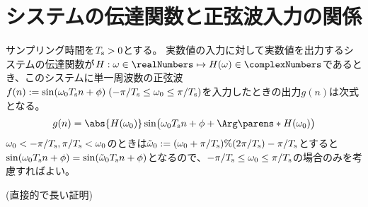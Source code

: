     \section{システムの伝達関数と正弦波入力の関係}
        \begin{shadebox}
            サンプリング時間を$T_\text{s}>0$とする。
            実数値の入力に対して実数値を出力するシステムの伝達関数が$H:\omega\in\realNumbers\mapsto H(\omega)\in\complexNumbers$であるとき、このシステムに単一周波数の正弦波$f(n) := \sin(\omega_0 T_\text{s} n + \phi)\;(-\pi/T_\text{s}\leq\omega_0\leq\pi/T_\text{s})$を入力したときの出力$g(n)$は次式となる。
            \[ g(n) = \abs{H(\omega_0)}\sin\bigl(\omega_0 \Ts n + \phi + \Arg\parens*{H(\omega_0)}\bigr) \]
            $\omega_0<-\pi/T_\text{s}, \pi/T_\text{s}<\omega_0$のときは$\tilde{\omega}_0 := (\omega_0+\pi/T_\text{s})\%(2\pi/T_\text{s})-\pi/T_\text{s}$とすると$\sin(\omega_0 T_\text{s} n + \phi) = \sin(\tilde{\omega}_0 T_\text{s} n + \phi)$となるので、$-\pi/T_\text{s}\leq\omega_0\leq\pi/T_\text{s}$の場合のみを考慮すればよい。
        \end{shadebox}
        (直接的で長い証明)
